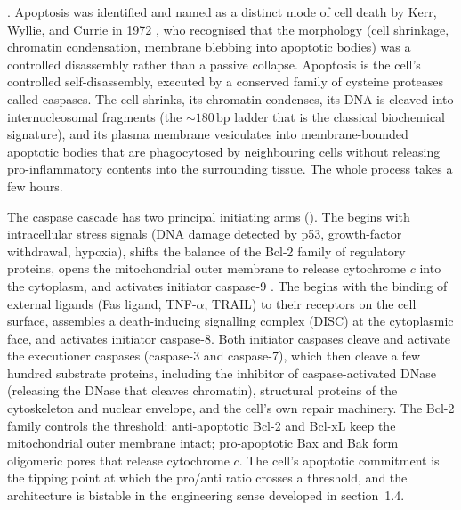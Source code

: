 . Apoptosis was identified and named as a distinct
mode of cell death by Kerr, Wyllie, and Currie in 1972
\cite{paper:v6c01-kerr-apoptosis-1972,paper:v6c01-kerr-1972-secondary},
who recognised that the morphology (cell shrinkage, chromatin
condensation, membrane blebbing into apoptotic bodies) was a
controlled disassembly rather than a passive collapse. Apoptosis is
the cell's controlled self-disassembly, executed by a conserved
family of cysteine proteases called caspases. The cell shrinks, its
chromatin condenses, its DNA is cleaved into internucleosomal
fragments (the $\sim 180\,\text{bp}$ ladder that is the classical
biochemical signature), and its plasma membrane vesiculates into
membrane-bounded apoptotic bodies that are phagocytosed by
neighbouring cells without releasing pro-inflammatory contents into
the surrounding tissue. The whole process takes a few hours.

The caspase cascade has two principal initiating arms
(). The  begins with intracellular stress signals (DNA
damage detected by p53, growth-factor withdrawal, hypoxia), shifts
the balance of the Bcl-2 family of regulatory proteins, opens the
mitochondrial outer membrane to release cytochrome $c$ into the
cytoplasm, and activates initiator caspase-9
\cite{paper:v6c01-vaux-korsmeyer-1999}. The  begins with the binding of external ligands
(Fas ligand, TNF-$\alpha$, TRAIL) to their receptors on the cell
surface, assembles a death-inducing signalling complex (DISC) at the
cytoplasmic face, and activates initiator caspase-8. Both initiator
caspases cleave and activate the executioner caspases (caspase-3 and
caspase-7), which then cleave a few hundred substrate proteins,
including the inhibitor of caspase-activated DNase (releasing the
DNase that cleaves chromatin), structural proteins of the cytoskeleton
and nuclear envelope, and the cell's own repair machinery. The Bcl-2
family controls the threshold: anti-apoptotic Bcl-2 and Bcl-xL keep
the mitochondrial outer membrane intact; pro-apoptotic Bax and Bak
form oligomeric pores that release cytochrome $c$. The cell's
apoptotic commitment is the tipping point at which the pro/anti ratio
crosses a threshold, and the architecture is bistable in the
engineering sense developed in section~1.4.



